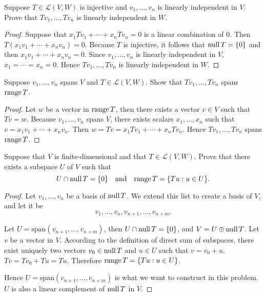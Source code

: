 \begin{exercise}\label{chapter3:sectionB:exercise9}
    Suppose $T \in \mathcal{L}(V, W)$ is injective and $v_{1}, \ldots, v_{n}$ is linearly independent in $V$. Prove that $Tv_{1} , \ldots, Tv_{n}$ is linearly independent in $W$.
\end{exercise}

\begin{proof}
    Suppose that $x_{1}Tv_{1} + \cdots + x_{n}Tv_{n} = 0$ is a linear combination of $0$. Then $T(x_{1}v_{1} + \cdots + x_{n}v_{n}) = 0$. Because $T$ is injective, it follows that $\text{null}\,{T} = \{0\}$ and then $x_{1}v_{1} + \cdots + x_{n}v_{n} = 0$. Since $v_{1}, \ldots, v_{n}$ is linearly independent in $V$, $x_{1} = \cdots = x_{n} = 0$. Hence $Tv_{1} , \ldots, Tv_{n}$ is linearly independent in $W$.
\end{proof}
\newpage

\begin{exercise}
    Suppose $v_{1} ,\ldots, v_{n}$ spans $V$ and $T \in \mathcal{L}(V, W)$. Show that $Tv_{1} , \ldots, Tv_{n}$ spans $\text{range}\,{T}$.
\end{exercise}

\begin{proof}
    Let $w$ be a vector in $\text{range}\,{T}$, then there exists a vector $v\in V$ such that $Tv = w$. Because $v_{1} ,\ldots, v_{n}$ spans $V$, there exists scalars $x_{1}, \ldots, x_{n}$ such that $v = x_{1}v_{1} + \cdots + x_{n}v_{n}$. Then $w = Tv = x_{1}Tv_{1} + \cdots + x_{n}Tv_{n}$. Hence $Tv_{1}, \ldots, Tv_{n}$ spans $\text{range}\,{T}$.
\end{proof}
\newpage

\begin{exercise}\label{chapter3:sectionB:exercise11}
    Suppose that $V$ is finite-dimensional and that $T \in \mathcal{L}(V, W)$. Prove that there exists a subspace $U$ of $V$ such that
    \[
        U \cap \text{null}\,{T} = \{ 0 \}     \quad\text{and}\quad \text{range}\,{T} = \{ Tu: u\in U \}.
    \]
\end{exercise}

\begin{proof}
    Let $v_{1}, \ldots, v_{n}$ be a basis of $\text{null}\,{T}$. We extend this list to create a basis of $V$, and let it be
    \[ v_{1}, \ldots, v_{n}, v_{n+1}, \ldots, v_{n+m}. \]

    Let $U = \text{span}(v_{n+1}, \ldots, v_{n+m})$, then $U\cap \text{null}\,{T} = \{0\}$, and $V = U\oplus \text{null}\,{T}$. Let $v$ be a vector in $V$. According to the definition of direct sum of subspaces, there exist uniquely two vectors $v_{0}\in\text{null}\,{T}$ and $u\in U$ such that $v = v_{0} + u$. $Tv = Tv_{0} + Tu = Tu$. Therefore $\text{range}\,{T} = \{ Tu: u\in U \}$.

    Hence $U = \text{span}(v_{n+1}, \ldots, v_{n+m})$ is what we want to construct in this problem. $U$ is also a linear complement of $\text{null}\,{T}$ in $V$.
\end{proof}
\newpage

